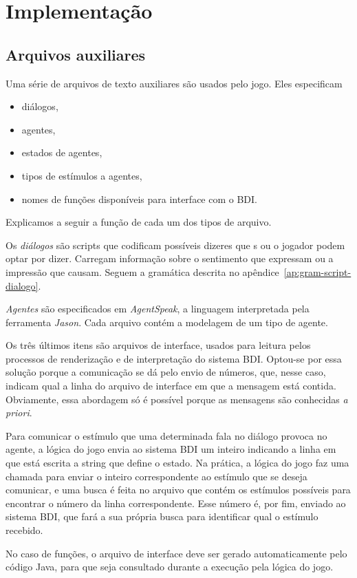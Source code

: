 \chapter{Implementação}

\section{Arquivos auxiliares}

Uma série de arquivos de texto auxiliares são usados pelo
jogo. Eles especificam
\begin{itemize}
\item diálogos,
\item agentes,
\item estados de agentes,
\item tipos de estímulos a agentes,
\item nomes de funções disponíveis para interface com o BDI.
\end{itemize}

Explicamos a seguir a função de cada um dos tipos de arquivo.

Os \emph{diálogos} são scripts que codificam possíveis dizeres que
\npc{}s ou o jogador podem optar por dizer. Carregam informação sobre
o sentimento que expressam ou a impressão que causam. Seguem a
gramática descrita no apêndice~\ref{ap:gram-script-dialogo}.

\emph{Agentes} são especificados em \emph{AgentSpeak}, a linguagem
interpretada pela ferramenta \emph{Jason}. Cada arquivo contém a
modelagem de um tipo de agente.

Os três últimos itens são arquivos de interface, usados para
leitura pelos processos de renderização e de interpretação do sistema
BDI. Optou-se por essa solução porque a comunicação se dá pelo envio de
números, que, nesse caso, indicam qual a linha do arquivo de interface
em que a mensagem está contida. Obviamente, essa abordagem só é
possível porque as mensagens são conhecidas \emph{a priori}.

Para comunicar o estímulo que uma determinada fala no diálogo provoca
no agente, a lógica do jogo envia ao sistema BDI um inteiro indicando
a linha em que está escrita a string que define o estado. Na prática,
a lógica do jogo faz uma chamada para enviar o inteiro correspondente
ao estímulo que se deseja comunicar, e uma busca é feita no arquivo
que contém os estímulos possíveis para encontrar o número da linha
correspondente. Esse número é, por fim, enviado ao sistema BDI, que
fará a sua própria busca para identificar qual o estímulo recebido.

No caso de funções, o arquivo de interface deve ser gerado
automaticamente pelo código Java, para que seja consultado durante a
execução pela lógica do jogo.

